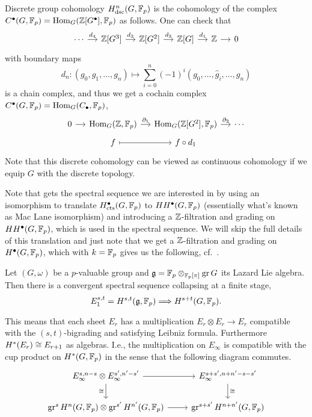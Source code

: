 Discrete group cohomology $H_{\mathrm{dsc}}^{n}(G,\mathbb{F}_{p})$ is the cohomology of the complex $C^{\bullet}(G,\mathbb{F}_{p}) = \operatorname{Hom}_{G}(\mathbb{Z}[G^{\bullet}],\mathbb{F}_{p})$ as follows. One can check that
\[
  \begin{tikzcd}[column sep=small]
    \cdots \ar[r,"d_{4}"] & \Z[G^3] \ar[r,"d_{3}"] & \Z[G^2] \ar[r,"d_{2}"] & \Z[G] \ar[r,"d_{1}"] & \Z \ar[r] & 0
  \end{tikzcd}
\]
with boundary maps
\[
  d_{n} \colon (g_0,g_1,\dotsc,g_n) \mapsto \sum_{i=0}^{n} (-1)^{i}(g_0,\dotsc,\widehat{g}_i,\dotsc,g_n)
\]
is a chain complex, and thus we get a cochain complex $C^\bullet(G,\mathbb{F}_p) = \operatorname{Hom}_G(C_\bullet,\mathbb{F}_p)$,
\[
  \begin{tikzcd}[column sep=small,row sep=tiny]
    0 \ar[r] & \Hom_G(\Z,\F_p) \ar[r,"\partial_{1}"] & \Hom_G(\Z[G^2],\F_p) \ar[r,"\partial_{2}"] & \cdots \\
    & f \ar[r,mapsto] & f \circ d_{1}
  \end{tikzcd}
\]
Note that this discrete cohomology can be viewed as continuous cohomology if we equip $G$ with the discrete topology.


Note that \cite{Sor} gets the spectral sequence we are interested in by using an isomorphism to translate $H_{\mathrm{cts}}^{\bullet}(G,\mathbb{F}_{p})$ to $HH^{\bullet}(G,\mathbb{F}_{p})$ (essentially what's known as Mac Lane isomorphism) and introducing a $\mathbb{Z}$-filtration and grading on $HH^{\bullet}(G,\mathbb{F}_{p})$, which is used in the spectral sequence. We will skip the full details of this translation and just note that we get a $\mathbb{Z}$-filtration and grading on $H^{\bullet}(G,\mathbb{F}_{p})$, which with $k=\mathbb{F}_{p}$ gives us the following, cf.\ \cite[Thm.~5.5--§6.1]{Sor}.

\begin{theorem}\label{thm:spec-seq}
  Let $(G,\omega)$ be a $p$-valuable group and $\mathfrak{g} = \mathbb{F}_{p} \otimes_{\mathbb{F}_{p}[\pi]} \operatorname{gr} G$ its Lazard Lie algebra. Then there is a convergent spectral sequence collapsing at a finite stage,
  \[
    E_1^{s,t} = H^{s,t}(\mathfrak{g},\mathbb{F}_{p}) \Longrightarrow H^{s+t}(G,\mathbb{F}_{p}).
  \]

  This means that each sheet $E_{r}$ has a multiplication $E_{r} \otimes E_{r} \to E_{r}$ compatible with the $(s,t)$-bigrading and satisfying Leibniz formula. Furthermore $H^{*}(E_{r}) \cong E_{r+1}$ as algebras. I.e., the multiplication on $E_\infty$ is compatible with the cup product on $H^{*}(G,\mathbb{F}_{p})$ in the sense that the following diagram commutes.
  \[
    \begin{tikzcd}
      E_\infty^{s,n-s} \otimes E_\infty^{s',n'-s'} \ar[r] \ar[d,swap,"\iso"] & E_\infty^{s+s',n+n'-s-s'} \ar[d,"\iso"] \\
      \gr^s H^n(G,\F_{p}) \otimes \gr^{s'} H^{n'}(G,\F_{p}) \ar[r] & \gr^{s+s'}H^{n+n'}(G,\F_{p})
    \end{tikzcd}
  \]
\end{theorem}

